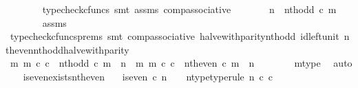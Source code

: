 \begin{isabellebody}
\ \ \ \ \ \ \isamarkupfalse%
\ {\isacharparenleft}{\kern0pt}typecheck{\isacharunderscore}{\kern0pt}cfuncs{\isacharcomma}{\kern0pt}\ smt\ assms\ comp{\isacharunderscore}{\kern0pt}associative{}{\isacharparenright}{\kern0pt}\isanewline
\ \ \ \ \isamarkupfalse%
\ \isamarkupfalse%
\ {\isachardoublequoteopen}n\ {\isacharequal}{\kern0pt}\ nth{\isacharunderscore}{\kern0pt}odd\ {\isasymcirc}\isactrlsub c\ m{\isachardoublequoteclose}\isanewline
\ \ \ \ \ \ \isamarkupfalse%
\ assms\ \isamarkupfalse%
\ {\isacharparenleft}{\kern0pt}typecheck{\isacharunderscore}{\kern0pt}cfuncs{\isacharunderscore}{\kern0pt}prems{\isacharcomma}{\kern0pt}\ smt\ comp{\isacharunderscore}{\kern0pt}associative{}\ halve{\isacharunderscore}{\kern0pt}with{\isacharunderscore}{\kern0pt}parity{\isacharunderscore}{\kern0pt}nth{\isacharunderscore}{\kern0pt}odd\ id{\isacharunderscore}{\kern0pt}left{\isacharunderscore}{\kern0pt}unit{}\ nth{\isacharunderscore}{\kern0pt}even{\isacharunderscore}{\kern0pt}nth{\isacharunderscore}{\kern0pt}odd{\isacharunderscore}{\kern0pt}halve{\isacharunderscore}{\kern0pt}with{\isacharunderscore}{\kern0pt}parity{\isacharparenright}{\kern0pt}\isanewline
\ \ \ \ \isamarkupfalse%
\ \isamarkupfalse%
\ {\isachardoublequoteopen}{\isasymforall}m{\isachardot}{\kern0pt}\ m\ {\isasymin}\isactrlsub c\ {\isasymnat}\isactrlsub c\ {\isasymlongrightarrow}\ nth{\isacharunderscore}{\kern0pt}odd\ {\isasymcirc}\isactrlsub c\ m\ {\isasymnoteq}\ n\ {\isasymLongrightarrow}\ {\isasymexists}m{\isachardot}{\kern0pt}\ m\ {\isasymin}\isactrlsub c\ {\isasymnat}\isactrlsub c\ {\isasymand}\ nth{\isacharunderscore}{\kern0pt}even\ {\isasymcirc}\isactrlsub c\ m\ {\isacharequal}{\kern0pt}\ n{\isachardoublequoteclose}\isanewline
\ \ \ \ \ \ \isamarkupfalse%
\ m{\isacharunderscore}{\kern0pt}type\ \isamarkupfalse%
\ auto\isanewline
\ \ \isamarkupfalse%
\isanewline
{}\isamarkupfalse%
%
\endisatagproof
{\isafoldproof}%
%
\isadelimproof
\isanewline
%
\endisadelimproof
\isanewline
{}\isamarkupfalse%
\ is{\isacharunderscore}{\kern0pt}even{\isacharunderscore}{\kern0pt}exists{\isacharunderscore}{\kern0pt}nth{\isacharunderscore}{\kern0pt}even{\isacharcolon}{\kern0pt}\isanewline
\ \ \ {\isachardoublequoteopen}is{\isacharunderscore}{\kern0pt}even\ {\isasymcirc}\isactrlsub c\ n\ {\isacharequal}{\kern0pt}\ {\isasymt}{\isachardoublequoteclose}\ \ n{\isacharunderscore}{\kern0pt}type{\isacharbrackleft}{\kern0pt}type{\isacharunderscore}{\kern0pt}rule{\isacharbrackright}{\kern0pt}{\isacharcolon}{\kern0pt}\ {\isachardoublequoteopen}n\ {\isasymin}\isactrlsub c\ {\isasymnat}\isactrlsub c{\isachardoublequoteclose}\isanewline

\end{isabellebody}
